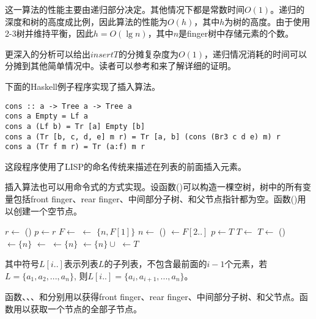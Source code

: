 \documentclass[UTF8]{article}
\begin{document}
这一算法的性能主要由递归部分决定。其他情况下都是常数时间$O(1)$。递归的深度和树的高度成比例，因此算法的性能为$O(h)$，其中$h$为树的高度。由于使用2-3树并维持平衡，因此$h= O(\lg n)$，其中$n$是finger树中存储元素的个数。

更深入的分析可以给出$insertT$的分摊复杂度为$O(1)$，递归情况消耗的时间可以分摊到其他简单情况中。读者可以参考\cite{okasaki-book}和\cite{finger-tree-2006}来了解详细的证明。

下面的Haskell例子程序实现了插入算法。

\begin{lstlisting}[style=Haskell]
cons :: a -> Tree a -> Tree a
cons a Empty = Lf a
cons a (Lf b) = Tr [a] Empty [b]
cons a (Tr [b, c, d, e] m r) = Tr [a, b] (cons (Br3 c d e) m) r
cons a (Tr f m r) = Tr (a:f) m r
\end{lstlisting}

这段程序使用了LISP的命名传统来描述在列表的前面插入元素。

插入算法也可以用命令式的方式实现。设函数()可以构造一棵空树，树中的所有变量包括front finger、rear finger、中间部分子树、和父节点指针都为空。函数()用以创建一个空节点。

\begin{algorithmic}
  \State $r \gets $ ()
  \State $p \gets r$
  \State {}
    \State $F \gets $   
    \State {} $\gets$ $\{n, F[1]\}$  
    \State $n \gets$ ()
    \State {} $\gets F[2..]$  
    \State $p \gets T$
    \State $T \gets$ 
  \EndWhile
    \State $T \gets$ ()
    \State {}$\gets \{ n \}$
    \State {} $\gets$ 
    \State {} $\gets \{ n \}$
  \Else
    \State {} $\gets \{ n \} \cup $ 
  \EndIf
  \State {} $\gets T$
  \State \Return {}
\EndFunction
\end{algorithmic}

其中符号$L[i..]$表示列表$L$的子列表，不包含最前面的$i-1$个元素，若$L = \{a_1, a_2, ..., a_n\}$, 则$L[i..] = \{a_i, a_{i+1}, ..., a_n\}$。

函数、、、和分别用以获得front finger、rear finger、中间部分子树、和父节点。函数用以获取一个节点的全部子节点。
\end{document}
